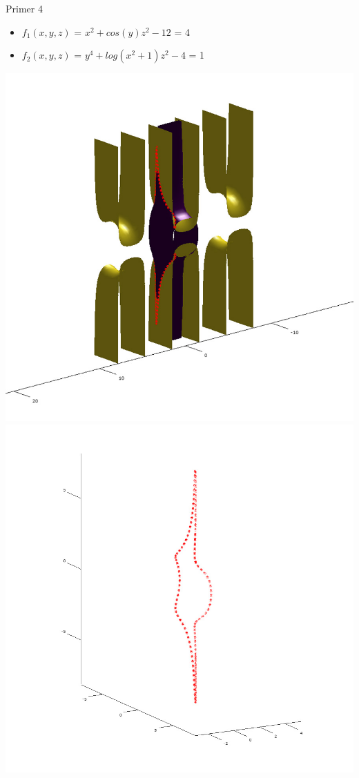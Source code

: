 \documentclass{beamer}
\begin{document}
	\begin{frame}{Primer 4}
		
		\begin{itemize}  
			\item $f_{1}(x,y,z)$ = $x^2 + cos(y)z^2 - 12$ = 4
			\item $f_{2}(x,y,z)$ = $y^4 + log(x^2 + 1)z^2 - 4$ = 1
		\end{itemize} 
		\includegraphics[scale=0.3]{primer4_1}
		\includegraphics[scale=0.3]{primer4_4}
		
	\end{frame}
	
\end{document}
